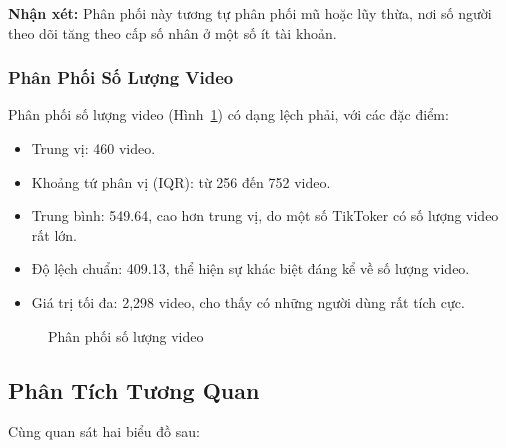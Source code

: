 \textbf{Nhận xét:} Phân phối này tương tự phân phối mũ hoặc lũy thừa, nơi số người theo dõi tăng theo cấp số nhân ở một số ít tài khoản.

\subsubsection{Phân Phối Số Lượng Video}

\noindent
Phân phối số lượng video (Hình~\ref{fig:phan_phoi_so_luong_video}) có dạng lệch phải, với các đặc điểm:
\begin{itemize}
    \item Trung vị: 460 video.
    
    \item Khoảng tứ phân vị (IQR): từ 256 đến 752 video.
    
    \item Trung bình: 549.64, cao hơn trung vị, do một số TikToker có số lượng video rất lớn.
    
    \item Độ lệch chuẩn: 409.13, thể hiện sự khác biệt đáng kể về số lượng video.
    
    \item Giá trị tối đa: 2,298 video, cho thấy có những người dùng rất tích cực.
\end{itemize}

\begin{figure}[ht]
    \centering
    \caption{Phân phối số lượng video}
    \label{fig:phan_phoi_so_luong_video}
\end{figure}

\vspace*{-10pt}
\subsection{Phân Tích Tương Quan}

\noindent
Cùng quan sát hai biểu đồ sau:

